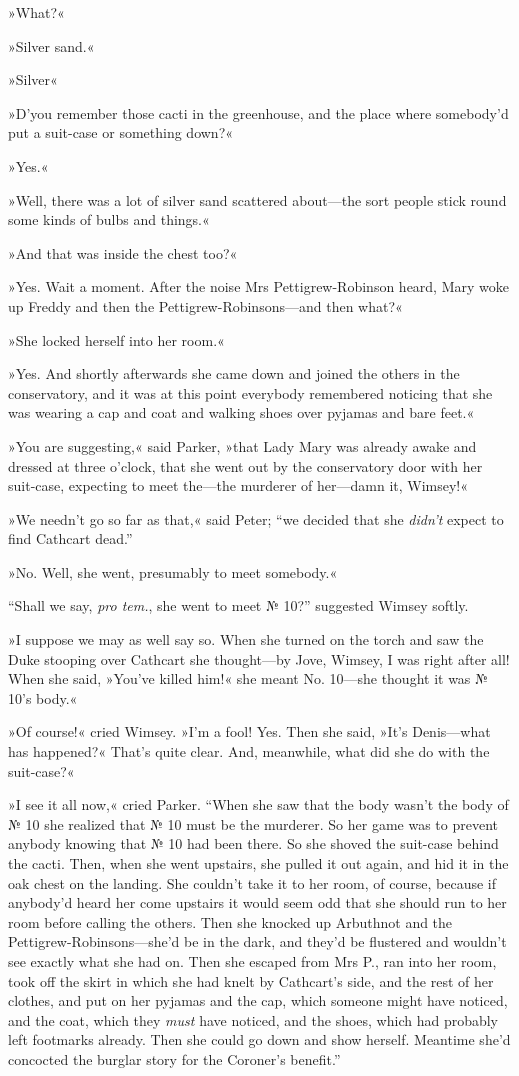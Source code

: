 »What?«

»Silver sand.«

»Silver\longdash«

»D'you remember those cacti in the greenhouse, and the place where somebody'd put a suit-case or something down?«

»Yes.«

»Well, there was a lot of silver sand scattered about—the sort people stick round some kinds of bulbs and things.«

»And that was inside the chest too?«

»Yes. Wait a moment. After the noise Mrs Pettigrew-Robinson heard, Mary woke up Freddy and then the Pettigrew-Robinsons—and then what?«

»She locked herself into her room.«

»Yes. And shortly afterwards she came down and joined the others in the conservatory, and it was at this point everybody remembered noticing that she was wearing a cap and coat and walking shoes over pyjamas and bare feet.«

»You are suggesting,« said Parker, »that Lady Mary was already awake and dressed at three o'clock, that she went out by the conservatory door with her suit-case, expecting to meet the—the murderer of her—damn it, Wimsey!«

»We needn't go so far as that,« said Peter; \enquote{we decided that she \textit{didn't} expect to find Cathcart dead.}

»No. Well, she went, presumably to meet somebody.«

\enquote{Shall we say, \textit{pro tem.}, she went to meet № 10?} suggested Wimsey softly.

»I suppose we may as well say so. When she turned on the torch and saw the Duke stooping over Cathcart she thought—by Jove, Wimsey, I was right after all! When she said, »You've killed him!« she meant No.  10—she thought it was № 10's body.«

»Of course!« cried Wimsey. »I'm a fool! Yes. Then she said, »It's Denis—what has happened?« That's quite clear. And, meanwhile, what did she do with the suit-case?«

»I see it all now,« cried Parker. \enquote{When she saw that the body wasn't the body of № 10 she realized that № 10 must be the murderer. So her game was to prevent anybody knowing that № 10 had been there.  So she shoved the suit-case behind the cacti. Then, when she went upstairs, she pulled it out again, and hid it in the oak chest on the landing. She couldn't take it to her room, of course, because if anybody'd heard her come upstairs it would seem odd that she should run to her room before calling the others. Then she knocked up Arbuthnot and the Pettigrew-Robinsons—she'd be in the dark, and they'd be flustered and wouldn't see exactly what she had on. Then she escaped from Mrs P., ran into her room, took off the skirt in which she had knelt by Cathcart's side, and the rest of her clothes, and put on her pyjamas and the cap, which someone might have noticed, and the coat, which they \textit{must} have noticed, and the shoes, which had probably left footmarks already. Then she could go down and show herself. Meantime she'd concocted the burglar story for the Coroner's benefit.}

